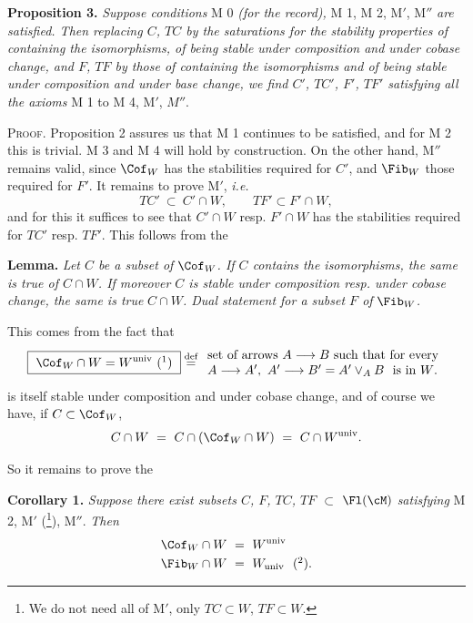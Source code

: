 \textbf{Proposition 3.} \textit{Suppose conditions} M 0 \textit{(for the record),} M 1, M 2, M$'$, M$''$ \textit{are satisfied. Then replacing $C$, $TC$ by the saturations for the stability properties of containing the isomorphisms, of being stable under composition and under cobase change, and $F$, $TF$ by those of containing the isomorphisms and of being stable under composition and under base change, we find $C'$, $TC'$, $F'$, $TF'$ satisfying}
\textit{all the axioms} M 1 to M 4, M$'$, $M''$. %

\textsc{Proof}. Proposition 2 assures us that M 1 continues to be satisfied, and for M 2 this is trivial. M 3 and M 4 will hold by construction. On the other hand, M$''$ remains valid, since $\Cof_W$ has the stabilities required for $C'$, and $\Fib_W$ those required for $F'$. It remains to prove M$'$, \textit{i.e.}
\[
TC'\ \subset\ C'\cap W,\qquad TF'\subset F'\cap W,
\]
and for this it suffices to see that $C'\cap W$ resp. $F'\cap W$ has the stabilities required for $TC'$ resp. $TF'$. This follows from the

\textbf{Lemma.} \textit{Let $C$ be a subset of} $\Cof_W$\textit{. If $C$ contains the isomorphisms, the same is true of $C\cap W$. If moreover $C$ is stable under composition resp. under cobase change, the same is true} \textit{$C\cap W$. Dual statement for a subset $F$ of} $\Fib_W$\textit{.}

This comes from the fact that
\[
\boxed{\ \Cof_W\cap W=W^{\mathrm{univ}}\ (\mbox{\footnotemark})\ }
\stackrel{\text{def}}{=}
\begin{array}{l}
\text{set of arrows $A\longrightarrow B$ such that for every}\\
A\longrightarrow A',\ A'\longrightarrow B'=A'\vee_A B\ \ \text{is in $W$.}
\end{array}
\]
is itself stable under composition and under cobase change, and of course we have, if $C\subset\Cof_W$,
\[
C\cap W\ =\ C\cap(\Cof_W\cap W)\ =\ C\cap W^{\mathrm{univ}}.
\]

So it remains to prove the

\textbf{Corollary 1.} \textit{Suppose there exist subsets $C$, $F$, $TC$, $TF$ $\subset$} $\Fl(\cM)$ \textit{satisfying} M 2, M$'$ (\footnote{We do not need all of M$'$, only $TC\subset W$, $TF\subset W$.}), M$''$. \textit{Then}
\[
\begin{aligned}
\Cof_W\cap W\ &=\ W^{\mathrm{univ}}\\
\Fib_W\cap W\ &=\ W_{\mathrm{univ}}\ \ (\mbox{\footnotemark}).
\end{aligned}
\]


